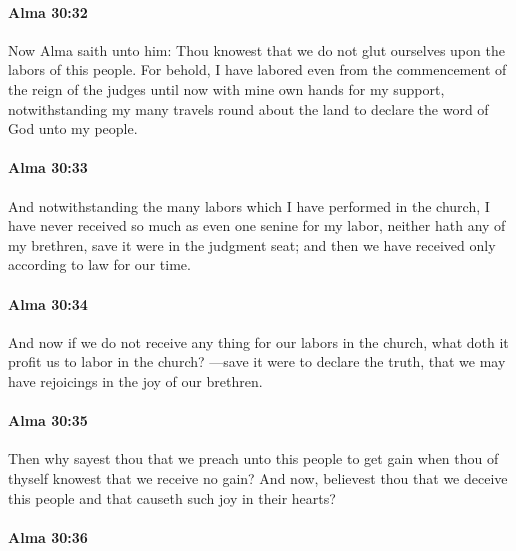 		\paragraph{Alma 30:32} %
			\label{ALMA-30-32}

			Now Alma saith unto him:
			Thou knowest that we do not glut ourselves upon the labors of this people.
			For behold, I have labored
			even from the commencement of the reign of the judges until now
			with mine own hands for my support,
			notwithstanding my many travels round about the land
			to declare the word of God unto my people.

		\paragraph{Alma 30:33} %
			\label{ALMA-30-33}

			And notwithstanding the many labors which I have performed in the church,
			I have never received so much as even one senine for my labor,
			neither hath any of my brethren,
			save it were in the judgment seat;
			and then we have received only according to law for our time.

		\paragraph{Alma 30:34} %
			\label{ALMA-30-34}

			And now if we do not receive any thing for our labors in the church,
			what doth it profit us to labor in the church?
			---save it were to declare the truth,
			that we may have rejoicings in the joy of our brethren.

		\paragraph{Alma 30:35} %
			\label{ALMA-30-35}

			Then why sayest thou that we preach unto this people to get gain
			when thou of thyself knowest that we receive no gain?
			And now, believest thou that we deceive this people
			and that causeth such joy in their hearts?

		\paragraph{Alma 30:36} %
			\label{ALMA-30-36}

